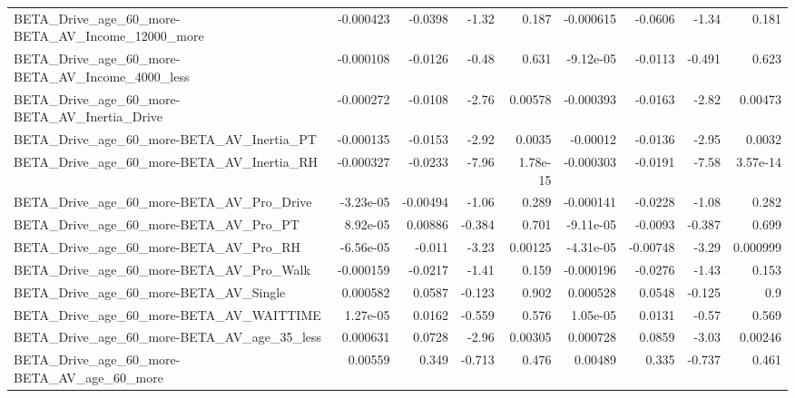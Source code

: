 \begin{tabular}{lrrrrrrrr}
BETA\_Drive\_age\_60\_more-BETA\_AV\_Income\_12000\_more   &   -0.000423 &      -0.0398 &    -1.32 &    0.187 &  -0.000615 &     -0.0606 &        -1.34 &         0.181 \\
BETA\_Drive\_age\_60\_more-BETA\_AV\_Income\_4000\_less    &   -0.000108 &      -0.0126 &    -0.48 &    0.631 &  -9.12e-05 &     -0.0113 &       -0.491 &         0.623 \\
BETA\_Drive\_age\_60\_more-BETA\_AV\_Inertia\_Drive       &   -0.000272 &      -0.0108 &    -2.76 &  0.00578 &  -0.000393 &     -0.0163 &        -2.82 &       0.00473 \\
BETA\_Drive\_age\_60\_more-BETA\_AV\_Inertia\_PT          &   -0.000135 &      -0.0153 &    -2.92 &   0.0035 &   -0.00012 &     -0.0136 &        -2.95 &        0.0032 \\
BETA\_Drive\_age\_60\_more-BETA\_AV\_Inertia\_RH          &   -0.000327 &      -0.0233 &    -7.96 & 1.78e-15 &  -0.000303 &     -0.0191 &        -7.58 &      3.57e-14 \\
BETA\_Drive\_age\_60\_more-BETA\_AV\_Pro\_Drive           &   -3.23e-05 &     -0.00494 &    -1.06 &    0.289 &  -0.000141 &     -0.0228 &        -1.08 &         0.282 \\
BETA\_Drive\_age\_60\_more-BETA\_AV\_Pro\_PT              &    8.92e-05 &      0.00886 &   -0.384 &    0.701 &  -9.11e-05 &     -0.0093 &       -0.387 &         0.699 \\
BETA\_Drive\_age\_60\_more-BETA\_AV\_Pro\_RH              &   -6.56e-05 &       -0.011 &    -3.23 &  0.00125 &  -4.31e-05 &    -0.00748 &        -3.29 &      0.000999 \\
BETA\_Drive\_age\_60\_more-BETA\_AV\_Pro\_Walk            &   -0.000159 &      -0.0217 &    -1.41 &    0.159 &  -0.000196 &     -0.0276 &        -1.43 &         0.153 \\
BETA\_Drive\_age\_60\_more-BETA\_AV\_Single              &    0.000582 &       0.0587 &   -0.123 &    0.902 &   0.000528 &      0.0548 &       -0.125 &           0.9 \\
BETA\_Drive\_age\_60\_more-BETA\_AV\_WAITTIME            &    1.27e-05 &       0.0162 &   -0.559 &    0.576 &   1.05e-05 &      0.0131 &        -0.57 &         0.569 \\
BETA\_Drive\_age\_60\_more-BETA\_AV\_age\_35\_less         &    0.000631 &       0.0728 &    -2.96 &  0.00305 &   0.000728 &      0.0859 &        -3.03 &       0.00246 \\
BETA\_Drive\_age\_60\_more-BETA\_AV\_age\_60\_more         &     0.00559 &        0.349 &   -0.713 &    0.476 &    0.00489 &       0.335 &       -0.737 &         0.461 \\

\end{tabular}

